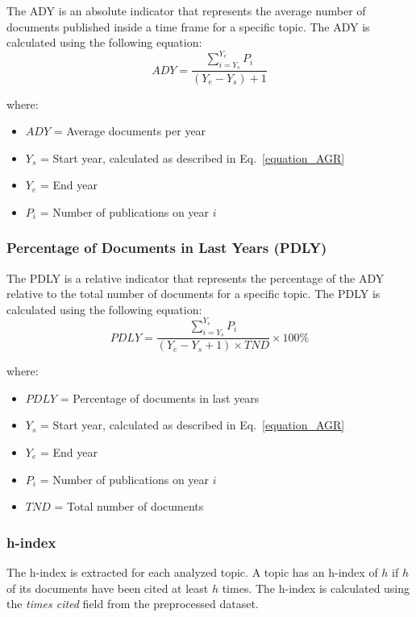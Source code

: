 \documentclass[10pt,letterpaper]{article}
\begin{document}
The ADY is an absolute indicator that represents the average number of documents published inside a time frame for a specific topic. The ADY is calculated using the following equation:
\begin{equation}
ADY = \frac{\sum\limits_{i = Y_s}^{Y_e}P_i}{(Y_e - Y_s)+1}
\label{equation_ADY}
\end{equation}

where:
\begin{itemize}
\item $ADY$ = Average documents per year
\item $Y_s$ = Start year, calculated as described in Eq.~\ref{equation_AGR}
\item $Y_e$ = End year
\item $P_i$ = Number of publications on year $i$
\end{itemize}

\subsubsection{Percentage of Documents in Last Years (PDLY)}

The PDLY is a relative indicator that represents the percentage of the ADY relative to the total number of documents for a specific topic. The PDLY is calculated using the following equation:
\begin{equation}
PDLY = \frac{\sum\limits_{i = Y_s}^{Y_e}P_i}{(Y_e - Y_s + 1) \times TND} \times 100\%
\label{equation_PDLY}
\end{equation}

where:
\begin{itemize}
\item $PDLY$ = Percentage of documents in last years
\item $Y_s$ = Start year, calculated as described in Eq.~\ref{equation_AGR}
\item $Y_e$ = End year
\item $P_i$ = Number of publications on year $i$
\item $TND$ = Total number of documents
\end{itemize}

\subsubsection{h-index}

The h-index is extracted for each analyzed topic. A topic has an h-index of $h$ if $h$ of its documents have been cited at least $h$ times. The h-index is calculated using the \textit{times cited} field from the preprocessed dataset.
\end{document}
